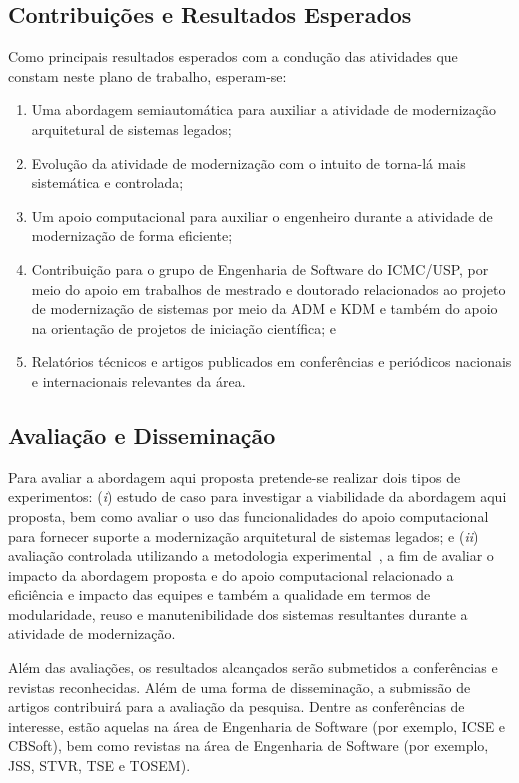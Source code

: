 \documentclass[12pt]{article}
\begin{document}
\subsection{Contribuições e Resultados Esperados}\label{sec:resultados_esperados}

Como principais resultados esperados com a condução das atividades que constam neste plano de trabalho, esperam-se:

\begin{enumerate}
\item Uma abordagem semiautomática  para auxiliar a atividade de modernização arquitetural de sistemas legados;
\item Evolução da atividade de modernização com o intuito de torna-lá mais sistemática e controlada;
\item Um apoio computacional para auxiliar o engenheiro durante a atividade de modernização de forma eficiente;
\item Contribuição para o grupo de Engenharia de Software do ICMC/USP, por meio do apoio em trabalhos de mestrado e doutorado relacionados ao projeto de modernização de sistemas por meio da ADM e KDM e também do apoio na orientação de projetos de iniciação científica; e
\item Relatórios técnicos e artigos publicados em conferências e periódicos nacionais e internacionais relevantes da área.
\end{enumerate}

\subsection{Avaliação e Disseminação}

Para avaliar a abordagem aqui proposta pretende-se realizar dois tipos de experimentos: (\textit{i}) estudo de caso para investigar a viabilidade da abordagem aqui proposta, bem como avaliar o uso das funcionalidades do apoio computacional para fornecer suporte a modernização arquitetural de sistemas legados; e (\textit{ii}) avaliação controlada utilizando a metodologia experimental~\cite{Wohlin}, a fim de avaliar o impacto da abordagem proposta e do apoio computacional relacionado a eficiência e impacto das equipes e também a qualidade em termos de modularidade, reuso e manutenibilidade dos sistemas resultantes durante a atividade de modernização.


Além das avaliações, os resultados alcançados serão submetidos a conferências e revistas reconhecidas. Além de uma forma de disseminação, a submissão de artigos contribuirá para a avaliação da pesquisa. Dentre as conferências de interesse, estão aquelas na área de Engenharia de Software (por exemplo, ICSE e CBSoft), bem como revistas na área de Engenharia de Software (por exemplo, JSS, STVR, TSE e TOSEM).
\end{document}
